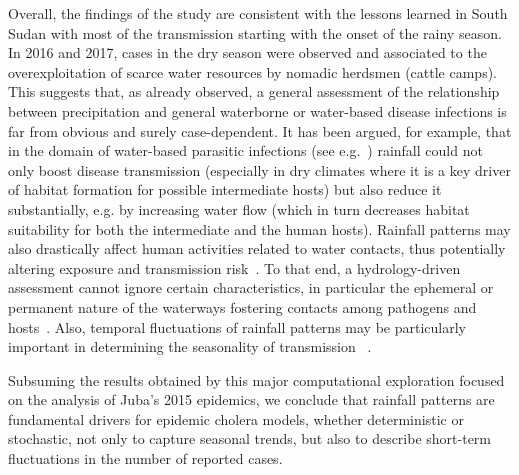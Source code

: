 Overall, the findings of the study are consistent with the lessons learned in South Sudan with most of the transmission starting with the onset of the rainy season. In 2016 and 2017, cases in the dry season were observed and associated to the overexploitation of scarce water resources by nomadic herdsmen (cattle camps). This suggests that, as already observed, a general assessment of the relationship between precipitation and general waterborne or water-based disease infections is far from obvious and surely case-dependent. It has been argued, for example, that in the domain of water-based parasitic infections (see e.g.~\cite{mccreesh2013,rinaldo17}) rainfall could not only boost disease transmission (especially in dry climates where it is a key driver of habitat formation for possible intermediate hosts) but also reduce it substantially, e.g. by increasing water flow (which in turn decreases habitat suitability for both the intermediate and the human hosts). Rainfall patterns may also drastically affect human activities related to water contacts, thus potentially altering exposure and transmission risk~\cite{lai2015}. To that end, a hydrology-driven assessment cannot ignore certain characteristics, in particular the ephemeral or permanent nature of the waterways fostering contacts among pathogens and hosts~\cite{perezsaez2016}. Also, temporal fluctuations of rainfall patterns may be particularly important in determining the seasonality of transmission ~\cite{bertuzzo12,bertuzzo2011b,mccreesh2015,perezsaez2016}.
  
Subsuming the results obtained by this major computational exploration focused on the analysis of Juba's 2015 epidemics, we conclude that rainfall patterns are fundamental drivers for epidemic cholera models, whether deterministic or stochastic, not only to capture seasonal trends, but also to describe short-term fluctuations in the number of reported cases. 


